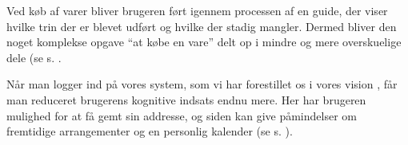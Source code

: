 Ved køb af varer bliver brugeren ført igennem processen af en guide, der viser hvilke trin der er blevet udført og hvilke der stadig mangler. Dermed bliver den noget komplekse opgave ``at købe en vare'' delt op i mindre og mere overskuelige dele \cite[s. 333]{Benyon2010} (se s. \pageref{b:p:koeb}.

Når man logger ind på vores system, som vi har forestillet os i vores vision \cite{osos}, får man reduceret brugerens kognitive indsats endnu mere. Her har brugeren mulighed for at få gemt sin addresse, og siden kan give påmindelser om fremtidige arrangementer og en personlig kalender (se s. \pageref{b:p:tilbud}).
